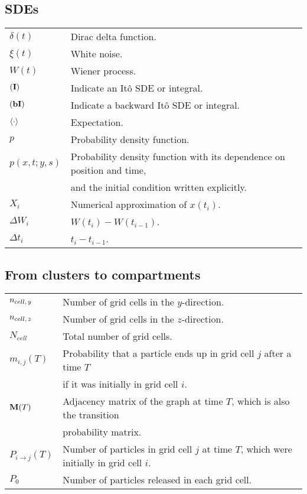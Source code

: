 \subsection*{SDEs}
\begin{table}[H]
\begin{tabular}{ll}
	$\delta(t)$ & Dirac delta function.\\
	$\xi(t)$ & White noise.\\
	$W(t)$ & Wiener process.\\
	$\mathbf{(I)\!}$ & Indicate an Itô SDE or integral.\\
	$\mathbf{(bI)\!}$ & Indicate a backward Itô SDE or integral.\\
	$\left\langle \cdot \right\rangle$ & Expectation.\\
	$p$ & Probability density function.\\
	$p(x,t;y,s)$ & Probability density function with its dependence on position and time,\\& and the initial condition written explicitly.\\
	$X_i$ & Numerical approximation of $x(t_i)$.\\
	$\Delta W_i$ & $W(t_i)-W(t_{i-1})$.\\
	$\Delta t_i$ & $t_i-t_{i-1}$.\\
\end{tabular}
\end{table}

\subsection*{From clusters to compartments}
\begin{table}[H]
\begin{tabular}{ll}
	$n_{cell,\,y}$ & Number of grid cells in the $y$-direction.\\
	$n_{cell,\,z}$ & Number of grid cells in the $z$-direction.\\
	$N_{cell}$ & Total number of grid cells.\\
	$m_{i,j}(T)$ & Probability that a particle ends up in grid cell $j$ after a time $T$\\ & if it was initially in grid cell $i$.\\
	$\mathbf M(T)$ & Adjacency matrix of the graph at time $T$, which is also the transition\\ & probability matrix.\\
	$P_{i \rightarrow j}(T)$ & Number of particles in grid cell $j$ at time $T$, which were initially in grid cell $i$.\\
	$P_0$ & Number of particles released in each grid cell.\\
\end{tabular}
\end{table}
